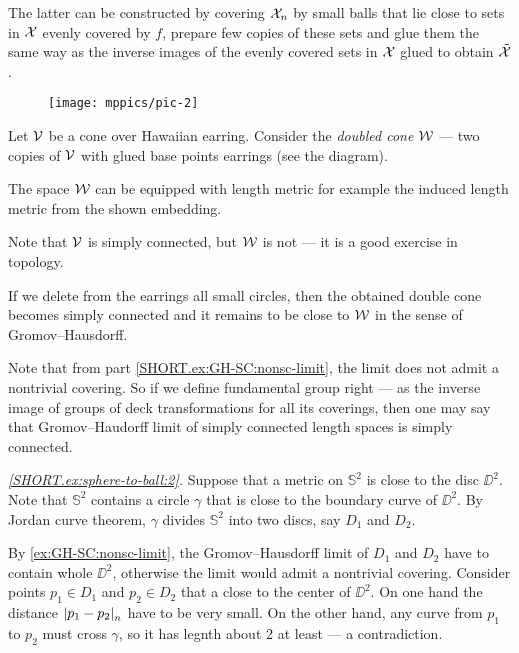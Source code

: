 The latter can be constructed by covering $\mathcal{X}_n$ by small balls that lie close to sets in $\mathcal{X}$ evenly covered by $f$, prepare few copies of these sets and glue them the same way as the inverse images of the evenly covered sets in $\mathcal{X}$ glued to obtain $\tilde{\mathcal{X}}$.

\begin{wrapfigure}{r}{40 mm}
\vskip-0mm
\centering
\texttt{[image: mppics/pic-2]}
\end{wrapfigure}

Let $\mathcal{V}$ be a cone over Hawaiian earring.
Consider the {}\emph{doubled cone} $\mathcal{W}$ --- two copies of $\mathcal{V}$ with glued base points earrings (see the diagram).

The space $\mathcal{W}$ can be equipped with length metric for example the induced length metric from the shown embedding.

Note that $\mathcal{V}$ is simply connected, but $\mathcal{W}$ is not --- it is a good exercise in topology.

If we delete from the earrings all small circles, then the obtained double cone becomes simply connected and it remains to be close to $\mathcal{W}$ in the sense of Gromov--Hausdorff.

Note that from part \ref{SHORT.ex:GH-SC:nonsc-limit}, the limit does not admit a nontrivial covering.
So if we define fundamental group right --- as the inverse image of groups of deck transformations for all its coverings, then one may say that Gromov--Haudorff limit of simply connected length spaces is simply connected.

\textit{\ref{SHORT.ex:sphere-to-ball:2}.}
Suppose that a metric on $\mathbb{S}^2$ is close to the disc $\DD^2$.
Note that $\mathbb{S}^2$ contains a circle $\gamma$ that is close to the boundary curve of $\DD^2$.
By Jordan curve theorem, $\gamma$ divides $\mathbb{S}^2$ into two discs, say $D_1$ and $D_2$.

By \ref{ex:GH-SC:nonsc-limit}, the Gromov--Hausdorff limit of $D_1$ and $D_2$ have to contain whole $\DD^2$, otherwise the limit would admit a nontrivial covering.
Consider points $p_1\in D_1$ and $p_2\in D_2$ that a close to the center of $\DD^2$.
On one hand the distance $\dist{p_1}{p_2}{n}$ have to be very small.
On the other hand, any curve from $p_1$ to $p_2$ must cross $\gamma$, so it has legnth about 2 at least --- a contradiction.



